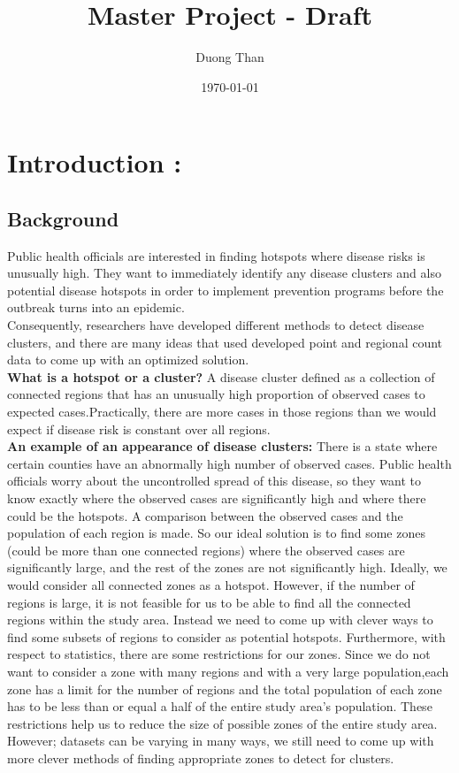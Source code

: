 \documentclass[12pt]{article}
\title{Master Project - Draft }
\author{Duong Than}
\date{\today}
\begin{document}
\maketitle	
	
		\section{Introduction :} 
		\subsection{Background} 

			Public health officials are interested in finding hotspots where disease risks is unusually high. They want to immediately identify any disease clusters and also potential disease hotspots in order to implement prevention programs before the outbreak turns into an epidemic. \\ 		
			
			Consequently, researchers have developed different methods to detect disease clusters, and there are many ideas that used developed point and regional count data to come up with an optimized solution. \\
			
			\textbf{What is a hotspot or a cluster?} A disease cluster defined as a collection of connected regions that has an unusually high proportion of observed cases to expected cases.Practically, there are more cases in those regions than we would expect if disease risk is constant over all regions.\\
			
			\textbf{An example of an appearance of disease clusters:} There is a state where certain counties  have an abnormally high number of observed cases. Public health officials worry about the uncontrolled spread of this disease, so they want to know exactly where the observed cases are significantly high and where there could be the hotspots. A comparison between the observed cases and the population of each region is made. So our ideal solution is to find some zones (could be more than one connected regions) where the observed cases are significantly large, and the rest of the zones are not significantly high. Ideally, we would consider all connected zones as a hotspot. However, if the number of regions is large, it is not feasible for us to be able to find all the connected regions within the study area. Instead we need to come up with clever ways to find some  subsets of regions to consider as potential hotspots. Furthermore, with respect to statistics, there are some restrictions for our zones. Since we do not want to consider a zone with many regions and with a very large population,each zone has a limit for the number of regions and the total population of each zone has to be less than or equal a half of the entire study area's population. These restrictions help us to reduce the size of possible zones of the entire study area. However; datasets can be varying in many ways, we still need to come up with more clever methods of finding appropriate zones to detect for clusters. \\       
			
\end{document}
